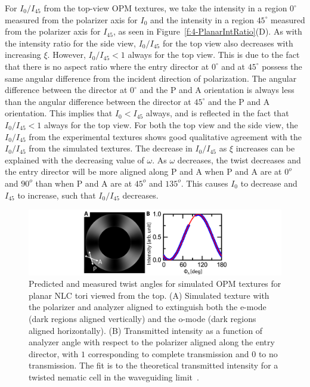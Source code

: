 For $I_0/I_{45}$ from the top-view OPM textures, we take the intensity in a region  $0^{\circ}$ measured from the polarizer axis for $I_0$ and the intensity in a region $45^{\circ}$ measured from the polarizer axis for $I_{45}$, as seen in Figure~\ref{f:4-PlanarIntRatio}(D).
As with the intensity ratio for the side view, $I_0/I_{45}$ for the top view also decreases with increasing $\xi$. However, $I_0/I_{45}<1$ always for the top view.
This is due to the fact that there is no aspect ratio where the entry director at $0^{\circ}$ and at $45^{\circ}$ possess the same angular difference from the incident direction of polarization.
The angular difference between the director at $0^{\circ}$ and the P and A orientation is always less than the angular difference between the director at $45^{\circ}$ and the P and A orientation.
This implies that $I_0 < I_{45}$ always, and is reflected in the fact that $I_0/I_{45}<1$ always for the top view.
For both the top view and the side view, the $I_0/I_{45}$ from the experimental textures shows good qualitative agreement with the $I_0/I_{45}$ from the simulated textures.
The decrease in $I_0/I_{45}$ as $\xi$ increases can be explained with the decreasing value of $\omega$.
As $\omega$ decreases, the twist decreases and the entry director will be more aligned along P and A when P and A are at $0^o$ and $90^o$ than when P and A are at $45^o$ and $135^o$.
This causes $I_0$ to decrease and $I_{45}$ to increase, such that $I_0/I_{45}$ decreases.
\begin{figure}
\centering
\includegraphics{figures/C4/Ch4-Figs_MeasuredTwist.png}
\caption{Predicted and measured twist angles for simulated OPM textures for planar NLC tori viewed from the top.
(A) Simulated texture with the polarizer and analyzer aligned to extinguish both the e-mode (dark regions aligned vertically) and the o-mode (dark regions aligned horizontally).
(B) Transmitted intensity as a function of analyzer angle with respect to the polarizer aligned along the entry director, with $1$ corresponding to complete transmission and $0$ to no transmission.
The fit is to the theoretical transmitted intensity for a twisted nematic cell in the waveguiding limit~\cite{RN232}.}\label{f:4-PlanarTwist}
\end{figure}

